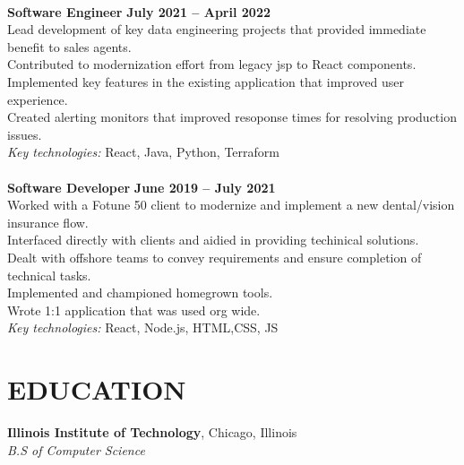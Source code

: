 \documentclass[margin,line]{resume}
\begin{document}
\begin{resume}
    \vspace{1mm}\\%
    \textbf{Software Engineer} \hfill \textbf{July 2021 -- April 2022}\\
    Lead development of key data engineering projects that provided immediate benefit to sales agents.\\
    Contributed to modernization effort from legacy jsp to React components.\\ 
    Implemented key features in the existing application that improved user experience.\\
    Created alerting monitors that improved resoponse times for resolving production issues.\\
    \textit{Key technologies:} React, Java, Python, Terraform \\

    \vspace{1mm}\\%
    \textbf{Software Developer} \hfill \textbf{June 2019 -- July 2021}\\    
    Worked with a Fotune 50 client to modernize and implement a new dental/vision insurance flow.\\
    Interfaced directly with clients and aidied in providing techinical solutions.\\   
    Dealt with offshore teams to convey requirements and ensure completion of technical tasks.\\
    Implemented and championed homegrown tools.\\
    Wrote 1:1 application that was used org wide.\\
    \textit{Key technologies:} React, Node.js, HTML,CSS, JS\\

\sectionline

    \section{\mysidestyle \textbf{\large{E}\small{DUCATION}}}

    \textbf{\listing Illinois Institute of Technology}, Chicago, Illinois \vspace{1mm}\\
    \textsl{B.S of Computer Science} \vspace{-3mm}\\\vspace{-1mm}%


\end{resume}
\end{document}
